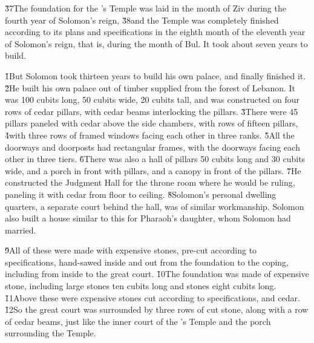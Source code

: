 \v{37}The foundation for the 's Temple was laid in the month of Ziv during the fourth year of Solomon's reign, \v{38}and the Temple was completely finished according to its plans and specifications in the eighth month of the eleventh year of Solomon's reign, that is, during the month of Bul. It took about seven years to build.

\v{1}But Solomon took thirteen years to build his own palace, and finally finished it. \v{2}He built his own palace out of timber supplied from the forest of Lebanon. It was 100 cubits long, 50 cubits wide, 20 cubits tall, and was constructed on four rows of cedar pillars, with cedar beams interlocking the pillars. \v{3}There were 45 pillars paneled with cedar above the side chambers, with rows of fifteen pillars, \v{4}with three rows of framed windows facing each other in three ranks. \v{5}All the doorways and doorposts had rectangular frames, with the doorways facing each other in three tiers. \v{6}There was also a hall of pillars 50 cubits long and 30 cubits wide, and a porch in front with pillars, and a canopy in front of the pillars. \v{7}He constructed the Judgment Hall for the throne room where he would be ruling, paneling it with cedar from floor to ceiling. \v{8}Solomon's personal dwelling quarters, a separate court behind the hall, was of similar workmanship. Solomon also built a house similar to this for Pharaoh's daughter, whom Solomon had married.

\v{9}All of these were made with expensive stones, pre-cut according to specifications, hand-sawed inside and out from the foundation to the coping, including from inside to the great court. \v{10}The foundation was made of expensive stone, including large stones ten cubits long and stones eight cubits long. \v{11}Above these were expensive stones cut according to specifications, and cedar. \v{12}So the great court was surrounded by three rows of cut stone, along with a row of cedar beams, just like the inner court of the 's Temple and the porch surrounding the Temple.

